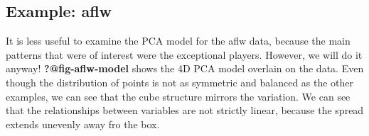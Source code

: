 \documentclass[
  letterpaper,
]{book}
\newenvironment{Shaded}{\begin{snugshade}}{\end{snugshade}}
\newcommand{\AttributeTok}[1]{\textcolor[rgb]{0.40,0.45,0.13}{#1}}
\newcommand{\ConstantTok}[1]{\textcolor[rgb]{0.56,0.35,0.01}{#1}}
\newcommand{\DecValTok}[1]{\textcolor[rgb]{0.68,0.00,0.00}{#1}}
\newcommand{\FloatTok}[1]{\textcolor[rgb]{0.68,0.00,0.00}{#1}}
\newcommand{\FunctionTok}[1]{\textcolor[rgb]{0.28,0.35,0.67}{#1}}
\newcommand{\NormalTok}[1]{\textcolor[rgb]{0.00,0.23,0.31}{#1}}
\newcommand{\OtherTok}[1]{\textcolor[rgb]{0.00,0.23,0.31}{#1}}
\newcommand{\SpecialCharTok}[1]{\textcolor[rgb]{0.37,0.37,0.37}{#1}}
\newcommand{\StringTok}[1]{\textcolor[rgb]{0.13,0.47,0.30}{#1}}
\begin{document}
\begin{Shaded}
\end{Shaded}

\hypertarget{example-aflw-1}{%
\subsection{Example: aflw}\label{example-aflw-1}}

It is less useful to examine the PCA model for the aflw data, because
the main patterns that were of interest were the exceptional players.
However, we will do it anyway! \textbf{?@fig-aflw-model} shows the 4D
PCA model overlain on the data. Even though the distribution of points
is not as symmetric and balanced as the other examples, we can see that
the cube structure mirrors the variation. We can see that the
relationships between variables are not strictly linear, because the
spread extends unevenly away fro the box.
\end{document}
